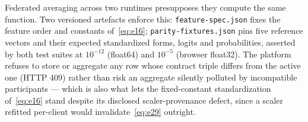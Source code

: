 Federated averaging across two runtimes presupposes they compute the same
function. Two versioned artefacts enforce this: \texttt{feature-spec.json}
fixes the feature order and constants of~\eqref{eq:e16}; \texttt{parity-fixtures.json}
pins five reference vectors and their expected standardized forms, logits and
probabilities, asserted by both test suites at $10^{-12}$ (float64) and
$10^{-5}$ (browser float32). The platform refuses to store or aggregate any
row whose contract triple differs from the active one (HTTP 409) rather than
risk an aggregate silently polluted by incompatible participants --- which is
also what lets the fixed-constant standardization of~\eqref{eq:e16} stand
despite its disclosed scaler-provenance defect, since a scaler refitted
per-client would invalidate~\eqref{eq:e29} outright.
